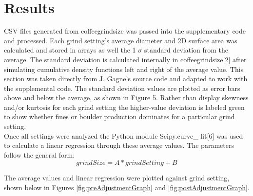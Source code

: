 \documentclass[10pt,a4paper,twocolumn,notitlepage]{article}
\begin{document}
\section{Results}
CSV files generated from coffeegrindsize was passed into the supplementary code and processed. Each grind setting's average diameter and 2D surface area was calculated and stored in arrays as well the 1 $\sigma$ standard deviation from the average. The standard deviation is calculated internally in coffeegrindsize[2] after simulating cumulative density functions left and right of the average value. This section was taken directly from J. Gagne's source code and adapted to work with the supplemental code. The standard deviation values are plotted as error bars above and below the average, as shown in Figure 5. Rather than display skewness and/or kurtosis for each grind setting the higher-value deviation is labeled green to show whether fines or boulder production dominates for a particular grind setting.\\

Once all settings were analyzed the Python module Scipy.curve\_ fit[6] was used to calculate a linear regression through these average values. The parameters follow the general form: $$grindSize = A*grindSetting + B$$ 

\begin{center}
\begin{table}[h]
\end{table}
\end{center}

The average values and linear regression were plotted against grind setting, shown below in Figures \ref{fig:preAdjustmentGraph} and \ref{fig:postAdjustmentGraph}.\\
\end{document}
